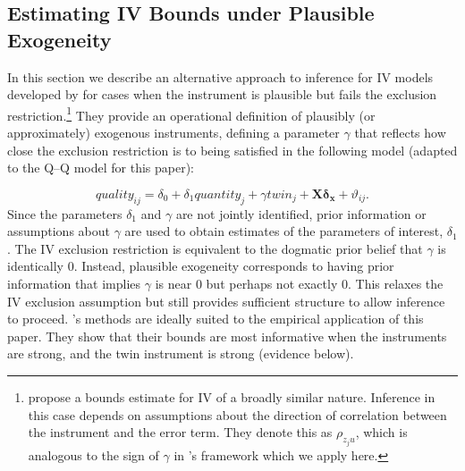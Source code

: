 \documentclass[subeqn]{article}
\begin{document}
\begin{spacing}{1.4}
\subsection{Estimating IV Bounds under Plausible Exogeneity}
\label{TWINscn:gamma}

In this section we describe an alternative approach to inference for IV models developed by \citet{Conleyetal2012} for cases when the instrument is plausible but fails the exclusion restriction.\footnote{\citet{NevoRosen2012} propose a bounds
  estimate for IV of a broadly similar nature.  Inference in this case depends on
  assumptions about the direction of correlation between the instrument and the
  error term. They denote this as $\rho_{z_{j}u}$, which is analogous to the sign
  of $\gamma$ in \citeauthor{Conleyetal2012}'s framework which we apply here.} 
They provide an operational definition of plausibly (or approximately) exogenous instruments, defining a parameter $\gamma$ that reflects how close the exclusion restriction is to
being satisfied in the following model (adapted to the Q--Q model for this paper):

\begin{equation}
  \label{TWINeqn:Conley}
  quality_{ij}=\delta_0 + \delta_1 quantity_j + \gamma twin_j + \bm{X}\bm{\delta_x} + \vartheta_{ij}.
\end{equation}
Since the parameters $\delta_1$ and $\gamma$ are not jointly identified,
prior information or assumptions about $\gamma$ are used
to obtain estimates of the parameters of interest, $\delta_1$. The IV
exclusion restriction is equivalent to the dogmatic prior belief
that $\gamma$ is identically 0. Instead, plausible exogeneity
corresponds to having prior information that implies $\gamma$ is near
0 but perhaps not exactly 0. This relaxes the IV
exclusion assumption but still provides sufficient structure to
allow inference to proceed. \citeauthor{Conleyetal2012}'s methods
are ideally suited to the empirical application of this paper. They
show that their bounds are most informative when the instruments are
strong, and the twin instrument is strong (evidence below).


\end{spacing}
\end{document}
